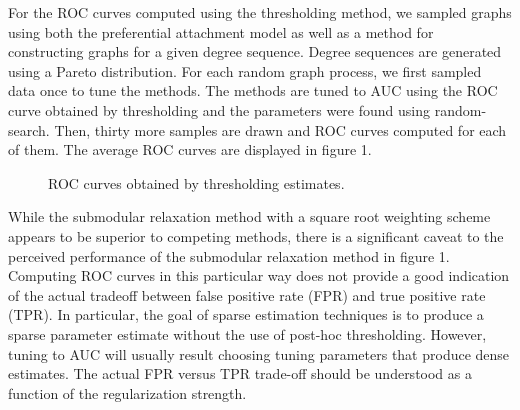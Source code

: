 \documentclass{uwstat572}
\theoremstyle{remark}
\theoremstyle{definition}
\begin{document}
For the ROC curves computed using the thresholding method, we sampled graphs using both the preferential attachment model as well as a method for constructing graphs for a given degree sequence.  Degree sequences are generated using a Pareto distribution. For each random graph process, we first sampled data once to tune the methods.   The methods are tuned to AUC using the ROC curve obtained by thresholding and the parameters were found using random-search.  Then, thirty more samples are drawn and ROC curves computed for each of them.  The average ROC curves are displayed in figure 1.

\begin{figure}
\caption{ROC curves obtained by thresholding estimates.}
\label{fig:threshold}
\end{figure}

While the submodular relaxation method with a square root weighting scheme appears to be superior to competing methods, there is a significant caveat to the perceived performance of the submodular relaxation method in figure 1.  Computing ROC curves in this particular way does not provide a good indication of the actual tradeoff between false positive rate (FPR) and true positive rate (TPR).  In particular, the goal of sparse estimation techniques is to produce a sparse parameter estimate without the use of post-hoc thresholding.  However, tuning to AUC will usually result choosing tuning parameters that produce dense estimates.  The actual FPR versus TPR trade-off should be understood as a function of the regularization strength.
\end{document}
